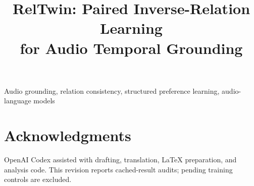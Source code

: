\documentclass[10pt,letterpaper]{article}
\title{\fontsize{14}{16}\selectfont RelTwin: Paired Inverse-Relation Learning\\for Audio Temporal Grounding}
\begin{document}
\maketitle

\begin{keywords}
Audio grounding, relation consistency, structured preference learning, audio-language models
\end{keywords}









\section{Acknowledgments}
OpenAI Codex assisted with drafting, translation, LaTeX preparation, and analysis code. This revision reports cached-result audits; pending training controls are excluded.
\clearpage
\balance


\end{document}
